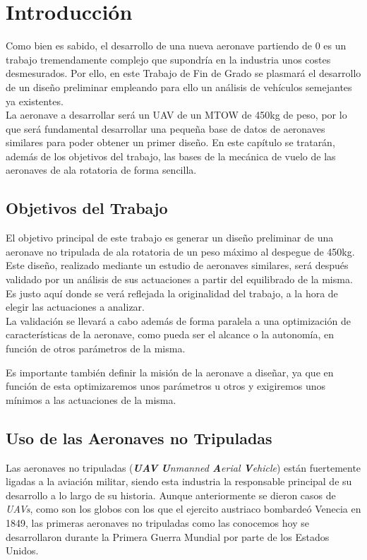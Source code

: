 \thispagestyle{empty}
\chapter{Introducción}

Como bien es sabido, el desarrollo de una nueva aeronave partiendo de 0 es un trabajo tremendamente complejo que supondría en la industria unos costes desmesurados. Por ello, en este Trabajo de Fin de Grado se plasmará el desarrollo de un diseño preliminar empleando para ello un análisis de vehículos semejantes ya existentes.\\

La aeronave a desarrollar será un UAV de un MTOW de 450kg de peso, por lo que será fundamental desarrollar una pequeña base de datos de aeronaves similares para poder obtener un primer diseño.
En este capítulo se tratarán, además de los objetivos del trabajo, las bases de la mecánica de vuelo de las aeronaves de ala rotatoria de forma sencilla.

\section{Objetivos del Trabajo}

El objetivo principal de este trabajo es generar un diseño preliminar de una aeronave no tripulada de ala rotatoria de un peso máximo al despegue de 450kg. Este diseño, realizado mediante un estudio de aeronaves similares, será después validado por un análisis de sus actuaciones a partir del equilibrado de la misma.
Es justo aquí donde se verá reflejada la originalidad del trabajo, a la hora de elegir las actuaciones a analizar.\\

La validación se llevará a cabo además de forma paralela a una optimización de características de la aeronave, como pueda ser el alcance o la autonomía, en función de otros parámetros de la misma.

Es importante también definir la misión de la aeronave a diseñar, ya que en función de esta optimizaremos unos parámetros u otros y exigiremos unos mínimos a las actuaciones de la misma.


\section{Uso de las Aeronaves no Tripuladas}
Las aeronaves no tripuladas (\emph{\textbf{UAV} \textbf{U}nmanned \textbf{A}erial \textbf{V}ehicle}) están fuertemente ligadas a la aviación militar, siendo esta industria la responsable principal de su desarrollo a lo largo de su historia.
Aunque anteriormente se dieron casos de \emph{UAVs}, como son los globos con los que el ejercito austriaco bombardeó Venecia en 1849, las primeras aeronaves no tripuladas como las conocemos hoy se desarrollaron durante la Primera Guerra Mundial por parte de los Estados Unidos.\\

